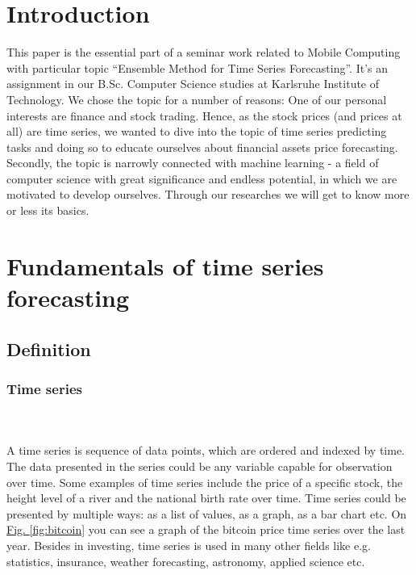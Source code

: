 \documentclass[runningheads,a4paper]{llncs}[2015/06/24]
\begin{document}
\section{Introduction}\label{sec:intro}
This paper is the essential part of a seminar work related to Mobile Computing with particular topic \enquote{Ensemble Method for Time Series Forecasting}. It's an assignment in our B.Sc. Computer Science studies at Karlsruhe Institute of Technology. We chose the topic for a number of reasons: One of our personal interests are finance and stock trading. Hence, as the stock prices (and prices at all) are time series, we wanted to dive into the topic of time series predicting tasks and doing so to educate ourselves about financial assets price forecasting. Secondly, the topic is narrowly connected with machine learning - a field of computer science with great significance and endless potential, in which we are motivated to develop ourselves. Through our researches we will get to know more or less its basics.       

\section{Fundamentals of time series forecasting}

	\subsection{Definition}
		\subsubsection{Time series}
		 \hspace{1cm}\\\\A time series is sequence of data points, which are ordered and indexed by time. The data presented in the series could be any variable capable for observation over time. Some examples of time series include the price of a specific stock, the height level of a river and the national birth rate over time. Time series could be presented by multiple ways: as a list of values, as a graph, as a bar chart etc. On  \hyperref[fig:bitcoin]{Fig. \ref{fig:bitcoin}} you can see a graph of the bitcoin price time series over the last year. Besides in investing, time series is used in many other fields like e.g. statistics, insurance, weather forecasting, astronomy, applied  science etc.
		
\end{document}
